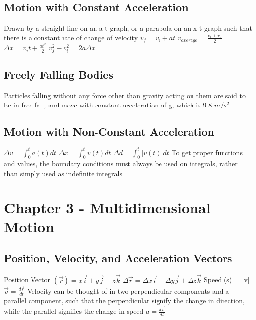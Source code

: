 \documentclass[11 pt, twoside]{article}
\newenvironment{outline*}
{
	\begin{outline}[enumerate]
	}
	{\end{outline}
}
\begin{document}
\subsection{Motion with Constant Acceleration}
\begin{outline*}
\1 Drawn by a straight line on an a-t graph, or a parabola on an x-t graph such that there is a constant rate of change of velocity
\1 $v_f = v_i + at$
\1 $v_{average} = \frac{v_i + v_f}{2}$
\1 $\Delta x = v_it + \frac{at^2}{2}$
\1 $v_f^2 - v_i^2 = 2a\Delta x$
\end{outline*}
\subsection{Freely Falling Bodies}
\begin{outline*}
\1 Particles falling without any force other than gravity acting on them are said to be in free fall, and move with constant acceleration of g, which is 9.8 $m/s^2$
\end{outline*}
\subsection{Motion with Non-Constant Acceleration}
\begin{outline*}
\1 $\Delta v = \int_0^t a(t)dt$
\1 $\Delta x = \int_0^t v(t)dt$
\1 $\Delta d = \int_0^t |v(t)|dt$
\1 To get proper functions and values, the boundary conditions must always be used on integrals, rather than simply used as indefinite integrals
\end{outline*}
\section{Chapter 3 - Multidimensional Motion}
\subsection{Position, Velocity, and Acceleration Vectors}
\begin{outline*}
\1 Position Vector $(\vec{r}) = x\vec{i} + y\vec{j} + z\vec{k}$
\1 $\Delta \vec{r} = \Delta x\vec{i} + \Delta y\vec{j} + \Delta z\vec{k}$
\1 Speed (s) = |v|
\1 $\vec{v} = \frac{d\vec{r}}{dt}$
\1 Velocity can be thought of in two perpendicular components and a parallel component, such that the perpendicular signify the change in direction, while the parallel signifies the change in speed
\1 $a = \frac{d\vec{v}}{dt}$
\end{outline*}
\end{document}

